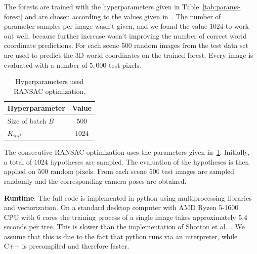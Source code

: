 \documentclass[final]{cvpr}
\begin{document}
The forests are trained with the hyperparameters given in Table~\ref{tab:params-forest} and are chosen according to the 
values given in~\cite{shotton2013}. The number of parameter samples per image wasn't given, and we found the
value $1024$ to work out well, because further increase wasn't improving the number of correct world coordinate predictions.
For each scene $500$ random images from the test data set are used
to predict the 3D world coordinates on the trained forest. Every image is evaluated with a number of $5,000$ test pixels.

\begin{table}[h!]
	\begin{center}
	\begin{tabular}{|l|c|}
	\hline
	Hyperparameter & Value \\
	\hline\hline
	Size of batch $B$ & $500$ \\
	$K_{init}$ & $1024$ \\
	
	\hline
	\end{tabular}
	\end{center}
	\caption{Hyperparameters used RANSAC optimization.}
	\label{tab:params-ransac}
\end{table}

The consecutive RANSAC optimization uses the parameters given in~\ref{tab:params-ransac}. Initially, a total of $1024$
hypotheses are sampled. The evaluation of the hypotheses is then applied on $500$ random pixels. From each scene $500$
test images are sampled randomly and the corresponding camera poses are obtained.

\textbf{Runtime}: The full code is implemented in python using multiprocessing libraries and vectorization. On a standard
desktop computer with AMD Ryzen 5-1600 CPU with 6 cores the training process of a single image
takes approximately $5.4$ seconds per tree. This is slower than the implementation of Shotton et al.~\cite{shotton2013}.
We assume that this is due to the fact that python runs via an interpreter, while C++ is precompiled and therefore faster.
\end{document}
